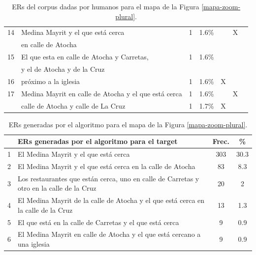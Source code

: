 \begin{table}[h]
{\begin{center}
\begin{tabular}{|l|l|c|c|c|c|c|}
14&Medina Mayrit y el que est\'a cerca			&1  &	1.6\%	&&X&\\
&en calle de Atocha	&	 &		&&&\\ \hline

15&El que esta en calle de Atocha y Carretas, 	      &	1	&	1.6\%	&&&\\
&y el de Atocha y de la Cruz	      &		&	&&&\\ \hline


16&pr\'oximo a la iglesia 	      &1		&	1.6\%	&X &&\\ \hline

17&Medina Mayrit en calle de Atocha y el que est\'a cerca  				&  1 &	1.6\%	&&X&\\ 
&calle de Atocha y calle de La Cruz  					&1  &	1.7\%	&X&&\\ \hline 

\end{tabular}
\caption{ERs del corpus dadas por humanos para el mapa de la Figura \ref{mapa-zoom-plural}.}\label{freq-mapa-zoom-plural}
\end{center}
}
\end{table}

\medskip

\begin{table}[H]
{\footnotesize
\begin{center}
\begin{tabular}{|l|l|c|c|}
\hline
& ERs generadas por el algoritmo para el target & Frec. & \%\\
\hline \hline
1& El Medina Mayrit y el que est\'a cerca& 303& 30.3\\ \hline
2& El Medina Mayrit y el que est\'a cerca en la calle de Atocha& 83& 8.3\\\hline
3& Los restaurantes que est\'an cerca, uno en calle de Carretas y otro en la calle de la Cruz&20 & 2 \\ \hline
4& El Medina Mayrit de la calle de Atocha y el que est\'a cerca en la calle de la Cruz&13 &1.3 \\ \hline
5& El que est\'a en la calle de Carretas y el que est\'a cerca & 9& 0.9\\ \hline
6& El Medina Mayrit en calle de Atocha y el que est\'a cercano a una iglesia &9 &0.9 \\

\hline
\end{tabular}
\caption{ERs generadas por el algoritmo para el mapa de la Figura \ref{mapa-zoom-plural}.}\label{freq-mapa-zoom-plural-algoritmo}
\end{center}
}
\end{table}

